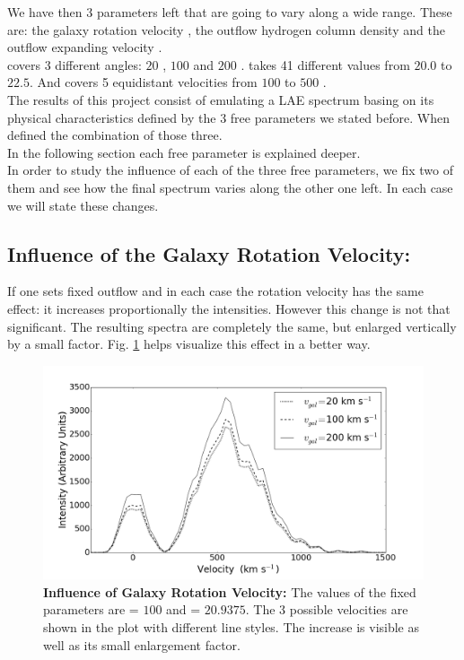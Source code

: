 We have then 3 parameters left that are going to vary along a wide range. These are: the galaxy rotation velocity \vrot, the outflow hydrogen column density \nh and the outflow expanding velocity \vout. \\

\vrot covers 3 different angles: $20$ \kms, $100$ \kms and $200$ \kms. \lognh takes 41 different values from $20.0$ to $22.5$. And \vout covers 5 equidistant velocities from $100$ \kms to $500$ \kms.  \\ 

The results of this project consist of emulating a LAE spectrum basing on its physical characteristics defined by the 3 free parameters we stated before. When defined the combination of those three. \\

In the following section each free parameter is explained deeper. \\

In order to study the influence of each of the three free parameters, we fix two of them and see how the final spectrum varies along the other one left. In each case we will state these changes.\\

\subsection{Influence of the Galaxy Rotation Velocity: \vrot}

If one sets fixed outflow \vout and \lognh in each case the rotation velocity has the same effect: it increases proportionally the intensities. However this change is not that significant. The resulting spectra are completely the same, but enlarged vertically by a small factor. Fig. \ref{fig:influence_vrot} helps visualize this effect in a better way.\\

\begin{figure}[h!]
	\begin{center}
		\includegraphics[width=1\textwidth]{./figures/appendix/inf_vgal_soft.png}
	\end{center}
	\caption{\textbf{Influence of Galaxy Rotation Velocity:} The values of the fixed parameters are \vout = $100$ \kms and \lognh = $20.9375$. The 3 possible velocities are shown in the plot with different line styles. The increase is visible as well as its small enlargement factor.}
	\label{fig:influence_vrot}
\end{figure}

